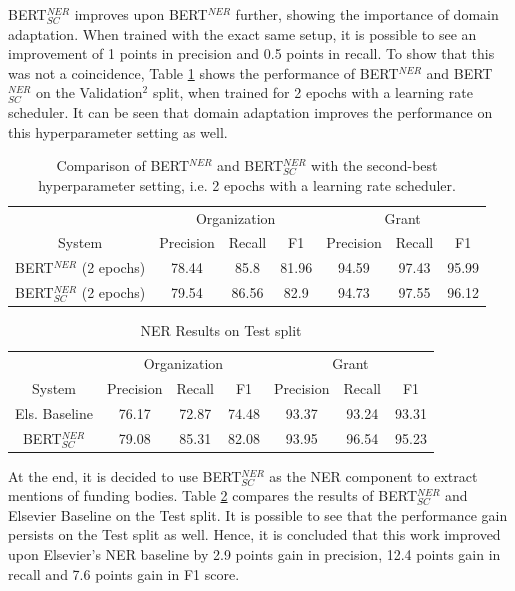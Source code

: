 \documentclass{report}
\theoremstyle{definition}
\theoremstyle{remark}
\begin{document}
BERT$^{NER}_{SC}$ improves upon BERT$^{NER}$ further, showing the importance of domain adaptation. When trained with the exact same setup, it is possible to see an improvement of 1 points in precision and 0.5 points in recall. To show that this was not a coincidence, Table \ref{tab:bertsccompareother} shows the performance of BERT$^{NER}$ and BERT$^{NER}_{SC}$ on the Validation$^2$ split, when trained for 2 epochs with a learning rate scheduler. It can be seen that domain adaptation improves the performance on this hyperparameter setting as well.

\begin{table}
    \centering
    \begin{tabular}{c| c c c| c c c}
    &\multicolumn{3}{c|}{Organization}&\multicolumn{3}{c}{Grant} \\
    System&Precision&Recall&F1&Precision&Recall&F1\\
    \hline
    BERT$^{NER}$ (2 epochs) &  78.44&85.8&81.96&94.59&97.43&95.99
 \\[0.7ex]
    BERT$^{NER}_{SC}$ (2 epochs) &  79.54&86.56&82.9&94.73&97.55&96.12
  \\[0.7ex]
    \end{tabular}
    \caption{Comparison of BERT$^{NER}$ and BERT$^{NER}_{SC}$ with the second-best hyperparameter setting, i.e. 2 epochs with a learning rate scheduler.}
    \label{tab:bertsccompareother}
\end{table}

\begin{table}
    \centering
    \begin{tabular}{c| c c c| c c c}
    &\multicolumn{3}{c|}{Organization}&\multicolumn{3}{c}{Grant} \\
    System&Precision&Recall&F1&Precision&Recall&F1\\
    \hline
    Els. Baseline &  76.17 & 72.87  & 74.48 & 93.37   & 93.24  & 93.31
 \\[0.7ex]
    BERT$^{NER}_{SC}$ &  79.08 & 85.31 & 82.08& 93.95&   96.54&   95.23
  \\[0.7ex]
    \end{tabular}
    \caption{NER Results on Test split}
    \label{tab:all_ner_results_test}
\end{table}

At the end, it is decided to use BERT$^{NER}_{SC}$ as the NER component to extract mentions of funding bodies. Table \ref{tab:all_ner_results_test} compares the results of BERT$^{NER}_{SC}$ and Elsevier Baseline on the Test split. It is possible to see that the performance gain persists on the Test split as well. Hence, it is concluded that this work improved upon Elsevier's NER baseline by 2.9 points gain in precision, 12.4 points gain in recall and 7.6 points gain in F1 score.
\end{document}
